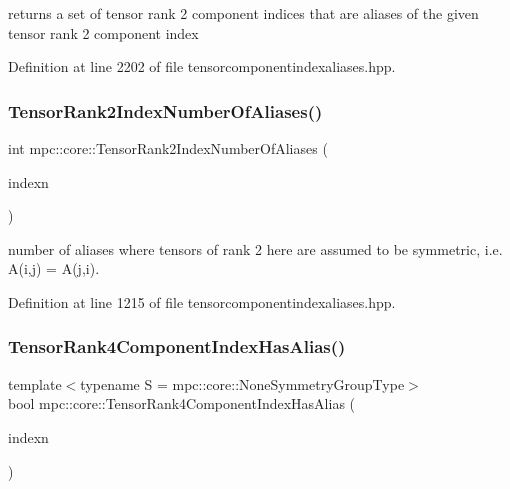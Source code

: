returns a set of tensor rank 2 component indices that are aliases of the given tensor rank 2 component index 



Definition at line 2202 of file tensorcomponentindexaliases.\+hpp.

\mbox{\label{namespacempc_1_1core_a35a48d42caf0b2d1c0fe29bdfbc6a416}} 
\subsubsection{\texorpdfstring{Tensor\+Rank2\+Index\+Number\+Of\+Aliases()}{TensorRank2IndexNumberOfAliases()}}
{\footnotesize\ttfamily int mpc\+::core\+::\+Tensor\+Rank2\+Index\+Number\+Of\+Aliases (\begin{DoxyParamCaption}\item[{const \mbox{\hyperlink{classmpc_1_1core_1_1_tensor_rank_n_component_index}{mpc\+::core\+::\+Tensor\+Rank\+N\+Component\+Index}}$<$ 2 $>$ \&}]{indexn }\end{DoxyParamCaption})\hspace{0.3cm}{\ttfamily [inline]}}



number of aliases where tensors of rank 2 here are assumed to be symmetric, i.\+e. A(i,j) = A(j,i). 



Definition at line 1215 of file tensorcomponentindexaliases.\+hpp.

\mbox{\label{namespacempc_1_1core_a7242817d0014fa66d25e5cf10a2c4ddf}} 
\subsubsection{\texorpdfstring{Tensor\+Rank4\+Component\+Index\+Has\+Alias()}{TensorRank4ComponentIndexHasAlias()}}
{\footnotesize\ttfamily template$<$typename S  = mpc\+::core\+::\+None\+Symmetry\+Group\+Type$>$ \\
bool mpc\+::core\+::\+Tensor\+Rank4\+Component\+Index\+Has\+Alias (\begin{DoxyParamCaption}\item[{const \mbox{\hyperlink{namespacempc_1_1core_a54c081f41b2475abd10182bf023805d2}{mpc\+::core\+::\+Tensor\+Rank4\+Component\+Index}} \&}]{indexn }\end{DoxyParamCaption})\hspace{0.3cm}{\ttfamily [inline]}}



